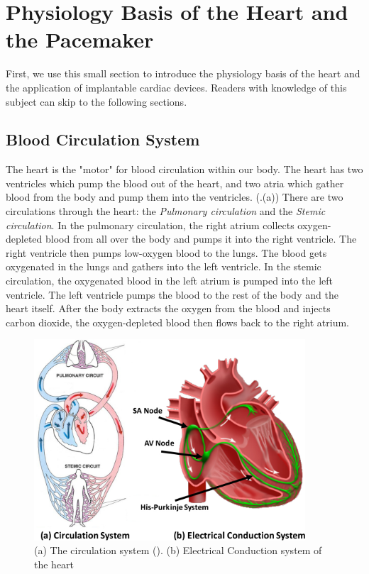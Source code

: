 \section{Physiology Basis of the Heart and the Pacemaker}
First, we use this small section to introduce the physiology basis of the heart and the application of implantable cardiac devices. 
Readers with knowledge of this subject can skip to the following sections.
\subsection{Blood Circulation System}
The heart is the "motor" for blood circulation within our body. The heart has two ventricles which pump the blood out of the heart, and two atria which gather blood from the body and pump them into the ventricles. (.(a)) There are two circulations through the heart: the \emph{Pulmonary circulation} and the \emph{Stemic circulation}. In the pulmonary circulation, the right atrium collects oxygen-depleted blood from all over the body and pumps it into the right ventricle. The right ventricle then pumps low-oxygen blood to the lungs. The blood gets oxygenated in the lungs and gathers into the left ventricle. In the stemic circulation, the oxygenated blood in the left atrium is pumped into the left ventricle. The left ventricle pumps the blood to the rest of the body and the heart itself. After the body extracts the oxygen from the blood and injects carbon dioxide, the oxygen-depleted blood then flows back to the right atrium.
\begin{figure}[!t]
\centering
		\includegraphics[width=0.9\textwidth]{figs/circulation.pdf}
		
\caption{\small (a) The circulation system (\cite{circ}). (b) Electrical Conduction system of the heart}
\label{fig:circulation}
\end{figure} 
